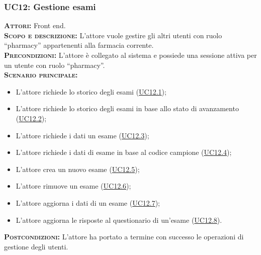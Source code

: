 \subsubsection{UC12: Gestione esami}
\label{sec:UC11}
\textsc{\textbf{Attori:}} Front end.\\
\textsc{\textbf{Scopo e descrizione:}} L'attore vuole gestire gli altri utenti con ruolo ``pharmacy'' appartenenti alla farmacia corrente.\\
\textsc{\textsc{\textbf{Precondizioni:}}} L'attore è collegato al sistema e possiede una sessione attiva per un utente con ruolo ``pharmacy''.\\
\textsc{\textbf{Scenario principale:}}
\begin{itemize}
    \item L'attore richiede lo storico degli esami (\hyperref[sec:UC121]{UC12.1});
    \item L'attore richiede lo storico degli esami in base allo stato di avanzamento (\hyperref[sec:UC122]{UC12.2});
    \item L'attore richiede i dati un esame (\hyperref[sec:UC123]{UC12.3});
    \item L'attore richiede i dati di esame in base al codice campione (\hyperref[sec:UC124]{UC12.4});
    \item L'attore crea un nuovo esame (\hyperref[sec:UC125]{UC12.5});
    \item L'attore rimuove un esame (\hyperref[sec:UC126]{UC12.6});
    \item L'attore aggiorna i dati di un esame (\hyperref[sec:UC127]{UC12.7});
    \item L'attore aggiorna le risposte al questionario di un'esame (\hyperref[sec:UC128]{UC12.8}).
\end{itemize}
\textsc{\textbf{Postcondizioni:}} L'attore ha portato a termine con successo le operazioni di gestione degli utenti.

